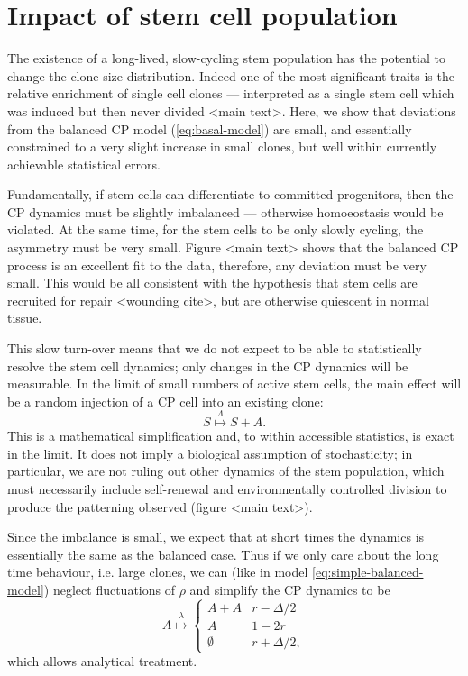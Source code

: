\documentclass[10pt,UKenglish]{article}
\begin{document}
\section{\label{sec:stem}Impact of stem cell population}

The existence of a long-lived, slow-cycling stem population has the potential to change the clone size distribution. Indeed one of the most significant traits is the relative enrichment of single cell clones --- interpreted as a single stem cell which was induced but then never divided <main text>. Here, we show that deviations from the balanced CP model (\ref{eq:basal-model}) are small, and essentially constrained to a very slight increase in small clones, but well within currently achievable statistical errors.

Fundamentally, if stem cells can differentiate to committed progenitors, then the CP dynamics must be slightly imbalanced --- otherwise homoeostasis would be violated. At the same time, for the stem cells to be only slowly cycling, the asymmetry must be very small. Figure <main text> shows that the balanced CP process is an excellent fit to the data, therefore, any deviation must be very small. This would be all consistent with the hypothesis that stem cells are recruited for repair <wounding cite>, but are otherwise quiescent in normal tissue.

This slow turn-over means that we do not expect to be able to statistically resolve the stem cell dynamics; only changes in the CP dynamics will be measurable. In the limit of small numbers of active stem cells, the main effect will be a random injection of a CP cell into an existing clone: 
\begin{equation}
S \overset{\Lambda}{\longmapsto} S+A. \label{eq:stem-division-model}
\end{equation}
This is a mathematical simplification and, to within accessible statistics, is exact in the limit. It does not imply a biological assumption of stochasticity; in particular, we are not ruling out other dynamics of the stem population, which must necessarily include self-renewal and environmentally controlled division to produce the patterning observed (figure <main text>).

Since the imbalance is small, we expect that at short times the dynamics is essentially the same as the balanced case. Thus if we only care about the long time behaviour, i.e. large clones, we can (like in model \ref{eq:simple-balanced-model}) neglect fluctuations of $\rho$ and simplify the CP dynamics to be
\begin{equation}
A \overset{\lambda}{\longmapsto} \begin{cases}
A+A & r - \Delta/2 \\
A & 1 - 2r \\
\emptyset & r + \Delta/2,
\end{cases}\label{eq:subcritical-cp-model}
\end{equation} which allows analytical treatment.
\end{document}
